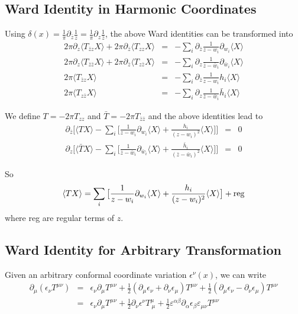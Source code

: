 \documentclass[12pt]{book}
\begin{document}
	
	\subsection{Ward Identity in Harmonic Coordinates}
	
	Using $\delta(x)=\frac 1\pi \partial_{\bar z}\frac 1z=\frac 1\pi \partial_z \frac 1{\bar z}$, the above Ward identities can be transformed into
	\begin{eqnarray}
		2\pi\partial_z\langle T_{\bar zz}X\rangle + 2\pi\partial_{\bar z}\langle T_{zz}X\rangle&=&-\sum_i \partial_{\bar z}\frac 1{z-w_i}\partial_{w_i}\langle X\rangle\\
		2\pi\partial_z\langle T_{\bar z\bar z}X\rangle + 2\pi\partial_{\bar z}\langle T_{z\bar z}X\rangle&=&-\sum_i \partial_{z}\frac 1{\bar z-\bar w_i}\partial_{\bar w_i}\langle X\rangle\\
		2\pi\langle T_{\bar zz}X\rangle&=&-\sum_i\partial_{\bar z}\frac 1{z-w_i}h_i\langle X\rangle\\
		2\pi\langle T_{z\bar z}X\rangle&=&-\sum_i\partial_{z}\frac 1{\bar z-\bar w_i}\bar h_i\langle X\rangle
	\end{eqnarray}
	
	We define $T=-2\pi T_{zz}$ and $\bar T=-2\pi T_{\bar z\bar z}$ and the above identities lead to
	\begin{eqnarray}
		\partial_{\bar z}\Big[ \langle TX\rangle-\sum_i\big[ \frac 1{z-w_i}\partial_{w_i}\langle X\rangle+\frac{h_i}{(z-w_i)^2}\langle X\rangle\big] \Big]&=&0\\
		\partial_{z}\Big[ \langle \bar TX\rangle-\sum_i\big[ \frac 1{\bar z-\bar w_i}\partial_{\bar w_i}\langle X\rangle+\frac{\bar h_i}{(\bar z-\bar w_i)^2}\langle X\rangle\big] \Big]&=&0
	\end{eqnarray}
	
	So
	\begin{equation}
		\langle TX\rangle=\sum_i\big[ \frac 1{z-w_i}\partial_{w_i}\langle X\rangle+\frac{h_i}{(z-w_i)^2}\langle X\rangle\big]+{\rm reg}
	\end{equation}
	where reg are regular terms of $z$.
	
	\subsection{Ward Identity for Arbitrary Transformation}
	Given an arbitrary conformal coordinate variation $\epsilon^\nu(x)$, we can write
	\begin{eqnarray}
		\partial_\mu(\epsilon_\nu T^{\mu\nu})&=&\epsilon_\nu\partial_\mu T^{\mu\nu}+\frac 12 (\partial_\mu\epsilon_\nu+\partial_\nu\epsilon_\mu)T^{\mu\nu}+\frac 12 (\partial_\mu\epsilon_\nu-\partial_\nu\epsilon_\mu)T^{\mu\nu}\\
		&=&\epsilon_\nu\partial_\mu T^{\mu\nu}+\frac 12 \partial_\nu\epsilon^\nu T^\mu_{\ \mu}+\frac 12 \varepsilon^{\alpha\beta}\partial_\alpha\epsilon_\beta\varepsilon_{\mu\nu}T^{\mu\nu}
	\end{eqnarray}
	
\end{document}
